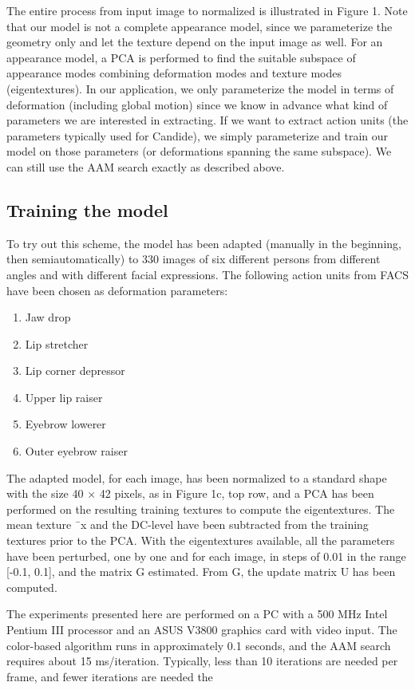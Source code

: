 \documentclass[12pt]{acmart}
\begin{document}
\begin{spacing}{2}
The entire process from input image to normalized is illustrated in Figure 1. Note that our model is not a complete appearance model, since we parameterize the geometry only and let the texture depend on the input image as well. For an appearance model, a PCA is performed to find the suitable subspace of appearance modes combining deformation modes and texture modes (eigentextures). In our application, we only parameterize the model in terms of deformation (including global motion) since we know in advance what kind of parameters we are interested in extracting. If we want to extract action units (the parameters typically used for Candide), we simply parameterize and train our model on those parameters (or deformations spanning the same subspace). We can still use the AAM search exactly as described above.

\subsection{Training the model}

To try out this scheme, the model has been adapted (manually in the beginning, then semiautomatically) to 330 images of six different persons from different angles and with different facial expressions. The following action units from FACS have been chosen as deformation parameters:


\begin{enumerate}
    \item Jaw drop
    \item Lip stretcher
    \item Lip corner depressor
    \item Upper lip raiser
    \item Eyebrow lowerer
    \item Outer eyebrow raiser
\end{enumerate}
The adapted model, for each image, has been normalized to a standard shape with the size 40 × 42 pixels, as in Figure 1c, top row, and a PCA has been performed on the resulting training textures to compute the eigentextures. The mean texture ¯x and the DC-level have been subtracted from the training textures prior to the PCA. With the eigentextures available, all the parameters have been perturbed, one by one and for each image, in steps of 0.01 in the range [-0.1, 0.1], and the matrix G estimated. From G, the update matrix U has been computed.

The experiments presented here are performed on a PC with a 500 MHz Intel Pentium III processor and an ASUS V3800 graphics card with video input. The color-based algorithm runs in approximately 0.1 seconds, and the AAM search requires about 15 ms/iteration. Typically, less than 10 iterations are needed per frame, and fewer iterations are needed the



\end{spacing}
\end{document}
